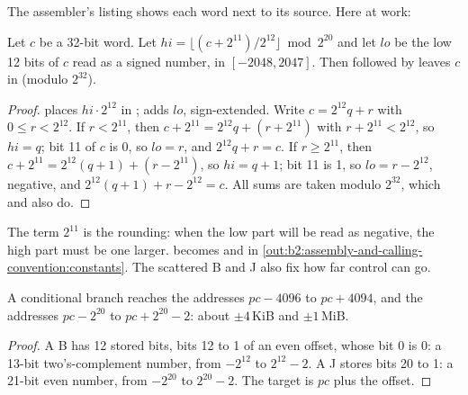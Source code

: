 The assembler's listing shows each word next to its source. Here  at work:

\label{out:b2:assembly-and-calling-convention:constants}

\begin{proposition}\label{prop:b2:assembly-and-calling-convention:li}
Let $c$ be a 32-bit word. Let $\mathit{hi} = \lfloor (c + 2^{11}) / 2^{12} \rfloor \bmod 2^{20}$ and let
$\mathit{lo}$ be the low 12 bits of $c$ read as a signed number, in $[-2048, 2047]$. Then 
followed by  leaves $c$ in  (modulo $2^{32}$).
\end{proposition}

\begin{proof}
 places $\mathit{hi} \cdot 2^{12}$ in ;  adds $\mathit{lo}$, sign-extended. Write $c = 2^{12} q
+ r$ with $0 \le r < 2^{12}$. If $r < 2^{11}$, then $c + 2^{11} = 2^{12} q + (r + 2^{11})$ with $r + 2^{11} < 2^{12}$,
so $\mathit{hi} = q$; bit 11 of $c$ is 0, so $\mathit{lo} = r$, and $2^{12} q + r = c$. If $r \ge 2^{11}$, then $c +
2^{11} = 2^{12} (q + 1) + (r - 2^{11})$, so $\mathit{hi} = q + 1$; bit 11 is 1, so $\mathit{lo} = r - 2^{12}$, negative,
and $2^{12}(q + 1) + r - 2^{12} = c$. All sums are taken modulo $2^{32}$, which  and  also do.
\end{proof}

The term $2^{11}$ is the rounding: when the low part will be read as negative, the high part must be one larger.
 becomes  and  in \cref{out:b2:assembly-and-calling-convention:constants}.
The scattered B and J  also fix how far control can go.

\begin{proposition}\label{prop:b2:assembly-and-calling-convention:ranges}
A conditional branch reaches the addresses $\mathit{pc} - 4096$ to $\mathit{pc} + 4094$, and  the
addresses $\mathit{pc} - 2^{20}$ to $\mathit{pc} + 2^{20} - 2$: about $\pm 4$\,KiB and $\pm 1$\,MiB.
\end{proposition}

\begin{proof}
A B  has 12 stored bits, bits 12 to 1 of an even offset, whose bit 0 is 0: a 13-bit two's-complement
number, from $-2^{12}$ to $2^{12} - 2$. A J  stores bits 20 to 1: a 21-bit even number, from $-2^{20}$ to
$2^{20} - 2$. The target is $\mathit{pc}$ plus the offset.
\end{proof}

